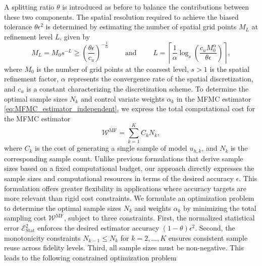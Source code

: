  
A splitting ratio $\theta$ is introduced as before to balance the contributions between these two components. The spatial resolution required to achieve the biased tolerance $\theta \epsilon^2$ is determined by estimating the number of spatial grid points $M_L$ at refinement level $L$, given by
 
%
\begin{equation}
    \label{eq:SLSGC_MLS_SpatialGridsNo}
    M_L = M_0s^{-L} \ge \left(\frac{\theta\epsilon}{c_u}\right)^{-\frac 1 {\alpha}} \qquad \text{ and } \qquad     L = \left\lceil \frac{1}{\alpha}\log_s \left(\frac{c_u M_0^\alpha}{\theta\epsilon}\right) \right\rceil,
\end{equation}
%
where $M_0$ is the number of grid points at the coarsest level, $s>1$ is the spatial refinement factor, $\alpha$ represents the convergence rate of the spatial discretization, and $c_u$ is a constant characterizing the discretization scheme. To determine the optimal sample sizes $N_k$ and control variate weights $\alpha_k$ in the MFMC estimator \eqref{eq:MFMC_estimator_independent}, we express the total computational cost for the MFMC estimator
%
\[
\mathcal{W}^{\text{MF}} = \sum_{k=1}^K C_kN_k,
\]
%
where $C_k$ is the cost of generating a single sample of model $u_{h,k}$, and $N_k$ is the corresponding sample count. Unlike previous formulations \cite{PeWiGu:2016} that derive sample sizes based on a fixed computational budget, our approach directly expresses the sample sizes and computational resources in terms of the desired accuracy $\epsilon$. This formulation offers greater flexibility in applications where accuracy targets are more relevant than rigid cost constraints. We formulate an optimization problem to determine the optimal sample sizes $N_k$ and weights $\alpha_k$ by minimizing the total sampling cost $\mathcal{W}^{\text{MF}}$, subject to three constraints. First, the normalized statistical error $\mathcal{E}_{\text{Stat}}^2$ enforces the desired estimator accuracy $(1-\theta)\epsilon^2$. Second,  the monotonicity constraints $N_{k-1}\le N_k$ for $k=2,\ldots, K$ ensures consistent sample reuse across fidelity levels. Third, all sample sizes must be non-negative. This leads to the following constrained optimization problem
